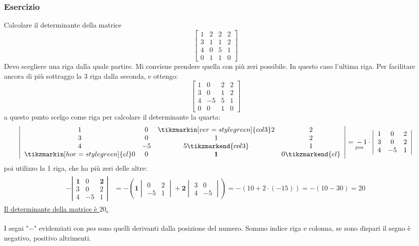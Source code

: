 \documentclass[italian]{article}
\begin{document}
\subsubsection{Esercizio}
Calcolare il determinante della matrice
\[
	\begin{bmatrix}
		1 & 2 & 2 & 2 \\ 3 & 1 & 1 & 2 \\ 4 & 0 & 5 & 1 \\ 0 & 1 & 1 & 0
	\end{bmatrix}
\]
Devo scegliere una riga dalla quale partire. Mi conviene prendere quella con più zeri possibile. In questo caso l'ultima riga. Per facilitare ancora di più sottraggo la 3 riga dalla seconda, e ottengo:
\[
	\begin{bmatrix}
		1 & 0 & 2 & 2 \\ 3 & 0 & 1 & 2 \\ 4 & -5 & 5 & 1 \\ 0 & 0 & 1 & 0
	\end{bmatrix}
\]
a questo punto scelgo come riga per calcolare il determinante la quarta:
\begin{gather*}
		\left|
			\begin{array}{cccc}
				1 & 0 & \tikzmarkin[ver=style green]{col 3}2 & 2 \\ 
				3 & 0 & 1 & 2 \\ 4 & -5 & 5\tikzmarkend{col 3} & 1 \\
				\tikzmarkin[hor=style green]{el}0 & 0 & \textbf{1} & 0\tikzmarkend{el}
			\end{array}
		\right|
		=
		\underset{pos}{-}1\cdot
		\left|
			\begin{array}{ccc}
				1 & 0 & 2 \\
				3 & 0 & 2 \\
				4 & -5 & 1
			\end{array}
		\right|
\end{gather*}
poi utilizzo la 1 riga, che ha più zeri delle altre:
\begin{gather*}
	\begin{split}
		-
		\left|
			\begin{array}{ccc}
				\textbf{1} & 0 & \textbf{2} \\
				3 & 0 & 2 \\
				4 & -5 & 1
			\end{array}
		\right|
		&=
		-
		\left(
			\textbf{1}
			\begin{vmatrix}
				0 & 2 \\
				-5 & 1
			\end{vmatrix}
			+
			\textbf{2}
			\begin{vmatrix}
				3 & 0 \\
				4 & -5
			\end{vmatrix}	
		\right) = 
		-(10 + 2\cdot(-15)) = -(10 - 30) = 20
	\end{split}
\end{gather*}
\underline{Il determinante della matrice è $20$.}\\\\
I segni "$-$" evidenziati con \textit{pos} sono quelli derivanti dalla posizione del numero. Sommo indice riga e colonna, se sono dispari il segno è negativo, positivo altrimenti.
\end{document}
